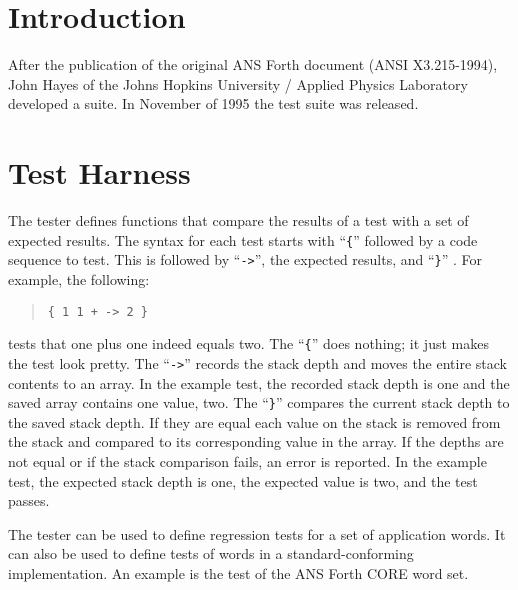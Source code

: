 \label{annex:test}

\section{Introduction} %
\label{test:intro}

After the publication of the original ANS Forth document
(ANSI X3.215-1994), John Hayes of the Johns Hopkins University /
Applied Physics Laboratory developed a  suite. In
November of 1995 the test suite was released.


\section{Test Harness}

The tester defines functions that compare the results of a test with a
set of expected results. The syntax for each test starts with
``\verb|{|''  followed by a code sequence to
test. This is followed by ``\verb|->|'', the expected results, and
``\verb|}|'' . For example, the following:
\begin{quote}
	\verb|{ 1 1 + -> 2 }|
\end{quote}
tests that one plus one indeed equals two.  The ``\verb|{|'' does
nothing; it just makes the test look pretty. The ``\verb|->|'' records
the stack depth and moves the entire stack contents to an array. In the
example test, the recorded stack depth is one and the saved array
contains one value, two. The ``\verb|}|'' compares the current stack
depth to the saved stack depth.
If they are equal each value on the stack is removed from the stack and
compared to its corresponding value in the array. If the depths are not
equal or if the stack comparison fails, an error is reported. In the
example test, the expected stack depth is one, the expected value is
two, and the test passes.

The tester can be used to define regression tests for a set of
application words. It can also be used to define tests of words in a
standard-conforming implementation. An example is the test of the ANS
Forth CORE word set.


